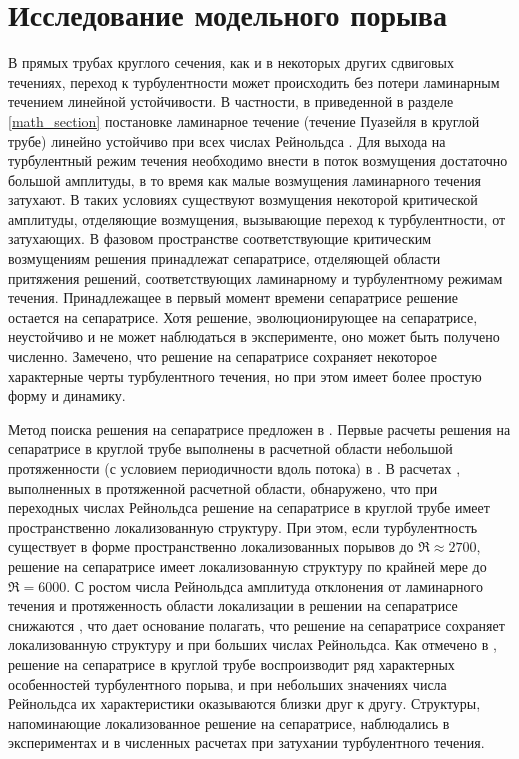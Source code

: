 
\chapter{Исследование модельного порыва}


В прямых трубах круглого сечения, как и в некоторых других сдвиговых течениях, переход к турбулентности может происходить без потери ламинарным течением линейной устойчивости. В частности, в приведенной в разделе \ref{math_section} постановке ламинарное течение (течение Пуазейля в круглой трубе) линейно устойчиво при всех числах Рейнольдса \cite{Kerswell2005}. Для выхода на турбулентный режим течения необходимо внести в поток возмущения достаточно большой амплитуды, в то время как малые возмущения ламинарного течения затухают. В таких условиях существуют возмущения некоторой критической амплитуды, отделяющие возмущения, вызывающие переход к турбулентности, от затухающих. В фазовом пространстве соответствующие критическим возмущениям решения принадлежат сепаратрисе, отделяющей области притяжения решений, соответствующих ламинарному и турбулентному режимам течения. Принадлежащее в первый момент времени сепаратрисе решение остается на сепаратрисе. Хотя решение, эволюционирующее на сепаратрисе, неустойчиво и не может наблюдаться в эксперименте, оно может быть получено численно. Замечено, что решение на сепаратрисе сохраняет некоторое характерные черты турбулентного течения, но при этом имеет более простую форму и динамику. 

Метод поиска решения на сепаратрисе предложен в \cite{Skufca2006}. Первые расчеты решения на сепаратрисе в круглой трубе выполнены в расчетной области небольшой протяженности (с условием периодичности вдоль потока) в \cite{Schneider2007}. В расчетах \cite{Mellibovsky2009transition, Duguet2010}, выполненных в протяженной расчетной области, обнаружено, что при переходных числах Рейнольдса решение на сепаратрисе в круглой трубе имеет пространственно локализованную структуру. При этом, если турбулентность существует в форме пространственно локализованных порывов до $\Re \approx 2700$, решение на сепаратрисе имеет локализованную структуру по крайней мере до $\Re = 6000$. С ростом числа Рейнольдса амплитуда отклонения от ламинарного течения и протяженность области локализации в решении на сепаратрисе снижаются \cite{Duguet2010}, что дает основание полагать, что решение на сепаратрисе сохраняет локализованную структуру и при больших числах Рейнольдса. Как отмечено в \cite{Duguet2010, Avila2013}, решение на сепаратрисе в круглой трубе воспроизводит ряд характерных особенностей турбулентного порыва, и при небольших значениях числа Рейнольдса их характеристики оказываются близки друг к другу. Структуры, напоминающие локализованное решение на сепаратрисе, наблюдались в экспериментах \cite{deLozar2012} и в численных расчетах \cite{Manneville2011} при затухании турбулентного течения. 

